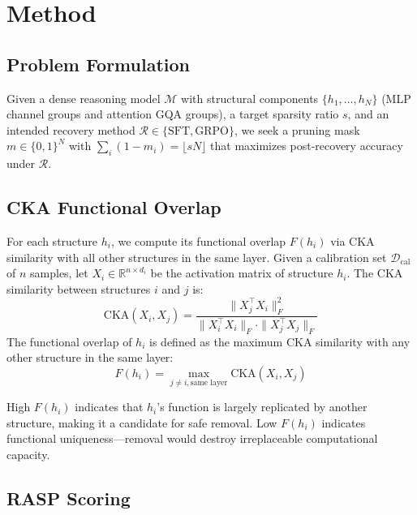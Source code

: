 \documentclass[11pt]{article}
\begin{document}
\section{Method}
\label{sec:method}

\subsection{Problem Formulation}

Given a dense reasoning model $\mathcal{M}$ with structural components $\{h_1, \ldots, h_N\}$ (MLP channel groups and attention GQA groups), a target sparsity ratio $s$, and an intended recovery method $\mathcal{R} \in \{\text{SFT}, \text{GRPO}\}$, we seek a pruning mask $m \in \{0,1\}^N$ with $\sum_i (1-m_i) = \lfloor sN \rfloor$ that maximizes post-recovery accuracy under $\mathcal{R}$.

\subsection{CKA Functional Overlap}

For each structure $h_i$, we compute its functional overlap $F(h_i)$ via CKA similarity with all other structures in the same layer. Given a calibration set $\mathcal{D}_{\text{cal}}$ of $n$ samples, let $X_i \in \mathbb{R}^{n \times d_i}$ be the activation matrix of structure $h_i$. The CKA similarity between structures $i$ and $j$ is:
\begin{equation}
\text{CKA}(X_i, X_j) = \frac{\|X_j^\top X_i\|_F^2}{\|X_i^\top X_i\|_F \cdot \|X_j^\top X_j\|_F}
\end{equation}
The functional overlap of $h_i$ is defined as the maximum CKA similarity with any other structure in the same layer:
\begin{equation}
F(h_i) = \max_{j \neq i, \text{same layer}} \text{CKA}(X_i, X_j)
\end{equation}

High $F(h_i)$ indicates that $h_i$'s function is largely replicated by another structure, making it a candidate for safe removal. Low $F(h_i)$ indicates functional uniqueness---removal would destroy irreplaceable computational capacity.

\subsection{RASP Scoring}
\end{document}
